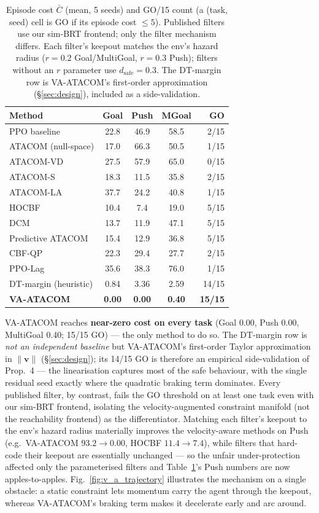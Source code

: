 \documentclass[letterpaper]{article}
\begin{document}
\begin{table}[t]
\centering
\caption{Episode cost $\bar{C}$ (mean, 5 seeds) and GO/15 count (a (task, seed) cell is GO if its episode cost $\le 5$). Published filters use our sim-BRT frontend; only the filter mechanism differs. Each filter's keepout matches the env's hazard radius ($r{=}0.2$ Goal/MultiGoal, $r{=}0.3$ Push); filters without an $r$ parameter use $d_{\text{safe}}{=}0.3$. The DT-margin row is VA-ATACOM's first-order approximation (\S\ref{sec:design}), included as a side-validation.}
\label{tab:main}
\begin{tabular}{lcccr}
\toprule
Method & Goal & Push & MGoal & GO \\
\midrule
PPO baseline       & 22.8 & 46.9 & 58.5 & 2/15 \\
\midrule
ATACOM (null-space)& 17.0 & 66.3 & 50.5 & 1/15 \\
ATACOM-VD          & 27.5 & 57.9 & 65.0 & 0/15 \\
ATACOM-S           & 18.3 & 11.5 & 35.8 & 2/15 \\
ATACOM-LA          & 37.7 & 24.2 & 40.8 & 1/15 \\
HOCBF              & 10.4 & 7.4  & 19.0 & 5/15 \\
DCM                & 13.7 & 11.9 & 47.1 & 5/15 \\
Predictive ATACOM  & 15.4 & 12.9 & 36.8 & 5/15 \\
CBF-QP             & 22.3 & 29.4 & 27.7 & 2/15 \\
PPO-Lag            & 35.6 & 38.3 & 76.0 & 1/15 \\
\midrule
DT-margin (heuristic) & 0.84 & 3.36 & 2.59 & 14/15 \\
\textbf{VA-ATACOM}    & \textbf{0.00} & \textbf{0.00} & \textbf{0.40} & \textbf{15/15} \\
\bottomrule
\end{tabular}
\end{table}

VA-ATACOM reaches \textbf{near-zero cost on every task} (Goal 0.00, Push 0.00, MultiGoal 0.40; 15/15 GO) --- the only method to do so. The DT-margin row is \emph{not an independent baseline} but VA-ATACOM's first-order Taylor approximation in $\|\boldsymbol v\|$ (\S\ref{sec:design}); its 14/15 GO is therefore an empirical side-validation of Prop.~4 --- the linearisation captures most of the safe behaviour, with the single residual seed exactly where the quadratic braking term dominates. Every published filter, by contrast, fails the GO threshold on at least one task even with our sim-BRT frontend, isolating the velocity-augmented constraint manifold (not the reachability frontend) as the differentiator. Matching each filter's keepout to the env's hazard radius materially improves the velocity-aware methods on Push (e.g.\ VA-ATACOM $93.2{\to}0.00$, HOCBF $11.4{\to}7.4$), while filters that hard-code their keepout are essentially unchanged --- so the unfair under-protection affected only the parameterised filters and Table~\ref{tab:main}'s Push numbers are now apples-to-apples. Fig.~\ref{fig:v_a_trajectory} illustrates the mechanism on a single obstacle: a static constraint lets momentum carry the agent through the keepout, whereas VA-ATACOM's braking term makes it decelerate early and arc around.
\end{document}

